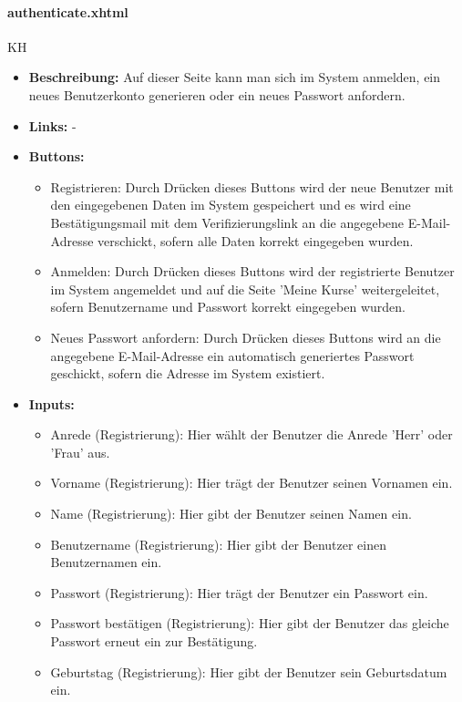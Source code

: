 				\paragraph{authenticate.xhtml}
				KH\\
				\begin{itemize}
					\item \textbf{Beschreibung:}
					Auf dieser Seite kann man sich im System anmelden, ein neues Benutzerkonto generieren oder ein neues Passwort anfordern.
					\item \textbf{Links:} -
					\item \textbf{Buttons:}
						\begin{itemize}
							\item Registrieren: Durch Drücken dieses Buttons wird der neue Benutzer mit den eingegebenen Daten im System gespeichert und es wird eine Bestätigungsmail mit dem Verifizierungslink an die angegebene E-Mail-Adresse verschickt, sofern alle Daten korrekt eingegeben wurden.
							\item Anmelden: Durch Drücken dieses Buttons wird der registrierte Benutzer im System angemeldet und auf die Seite 'Meine Kurse' weitergeleitet, sofern Benutzername und Passwort korrekt eingegeben wurden.
							\item Neues Passwort anfordern: Durch Drücken dieses Buttons wird an die angegebene E-Mail-Adresse ein automatisch generiertes Passwort geschickt, sofern die Adresse im System existiert.
						\end{itemize}
					\item \textbf{Inputs:}
						\begin{itemize}
							\item Anrede (Registrierung): Hier wählt der Benutzer die Anrede 'Herr' oder 'Frau' aus.
							\item Vorname (Registrierung): Hier trägt der Benutzer seinen Vornamen ein.
							\item Name (Registrierung): Hier gibt der Benutzer seinen Namen ein.
							\item Benutzername (Registrierung): Hier gibt der Benutzer einen Benutzernamen ein.
							\item Passwort (Registrierung): Hier trägt der Benutzer ein Passwort ein.
							\item Passwort bestätigen (Registrierung): Hier gibt der Benutzer das gleiche Passwort erneut ein zur Bestätigung.
							\item Geburtstag (Registrierung): Hier gibt der Benutzer sein Geburtsdatum ein.

\end{itemize}
\end{itemize}
